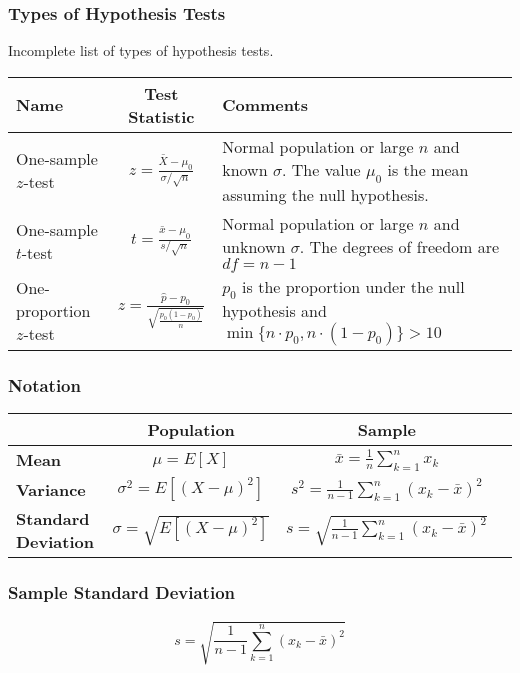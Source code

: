 \documentclass{beamer}
\begin{document}
\begin{frame}
\frametitle{Types of Hypothesis Tests}
\small
Incomplete list of types of hypothesis tests.

\begin{tabular}{p{1.3in} c p{2in}}
\hline
Name				&	Test Statistic							&	Comments \\\hline
One-sample $z$-test		&	$z = \frac{\bar{X} - \mu_0}{\sigma/\sqrt{n}}$	&	\tiny Normal population or large $n$ and known $\sigma$. The value $\mu_0$ is the mean assuming the null hypothesis. \\
One-sample $t$-test		&	$t = \frac{\bar{x} - \mu_0}{s/\sqrt{n}}$			&	\tiny Normal population or large $n$ and unknown $\sigma$. The degrees of freedom are $df = n - 1$\\
One-proportion $z$-test	&	$z = \frac{\hat{p} - p_0}{\sqrt{\frac{p_0(1 - p_0)}{n}}}$& \tiny	$p_0$ is the proportion under the null hypothesis and $\min\{ n\cdot p_0, n\cdot (1- p_0)\} > 10$\\
\end{tabular}
\end{frame}

\begin{frame}
\frametitle{Notation}

\begin{tabular}{l | c c c}
					&	{\bf Population}					&	{\bf Sample}\\\hline
{\bf Mean}				&	$\mu = E[X]$					&	$\bar{x} = \displaystyle\frac{1}{n}\sum_{k = 1}^n x_k$\\
{\bf Variance}			&	$\sigma^2 = E[(X - \mu)^2]$		&	$s^2 = \displaystyle\frac{1}{n - 1}\sum_{k = 1}^n (x_k - \bar{x})^2$\\
{\bf Standard Deviation}	&	$\sigma = \sqrt{E[(X - \mu)^2]}$		&	$s = \sqrt{ \displaystyle\frac{1}{n - 1}\sum_{k = 1}^n (x_k - \bar{x})^2}$\\
\end{tabular}

\end{frame}

\begin{frame}
\frametitle{Sample Standard Deviation}

$$s = \sqrt{\frac{1}{n - 1}\sum_{k = 1}^n (x_k - \bar{x})^2}$$

\end{frame}
\end{document}
